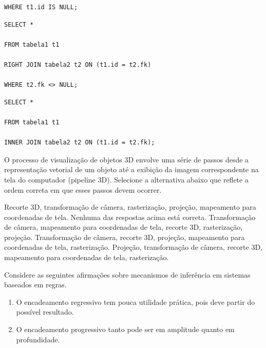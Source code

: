 \documentclass[12pt, addpoints]{exam}
\begin{document}
\begin{questions}
\begin{choices}
\begin{verbatim}
WHERE t1.id IS NULL;

\end{verbatim}


\choice \begin{verbatim}SELECT *

FROM tabela1 t1

RIGHT JOIN tabela2 t2 ON (t1.id = t2.fk)

WHERE t2.fk <> NULL;

\end{verbatim}


\choice \begin{verbatim}SELECT *

FROM tabela1 t1

INNER JOIN tabela2 t2 ON (t1.id = t2.fk);

\end{verbatim}


\end{choices}

\question

O processo de visualização de objetos 3D envolve uma série de passos desde a representação vetorial de um objeto até a exibição da imagem correspondente na tela do computador (pipeline 3D). Selecione a alternativa abaixo que reflete a ordem correta em que esses passos devem ocorrer. 
\begin{choices}
\choice Recorte 3D, transformação de câmera, rasterização, projeção, mapeamento para coordenadas de tela. 
\choice Nenhuma das respostas acima está correta.
\choice Transformação de câmera, mapeamento para coordenadas de tela, recorte 3D, rasterização, projeção. 
\choice Transformação de câmera, recorte 3D, projeção, mapeamento para coordenadas de tela, rasterização. 
\choice Projeção, transformação de câmera, recorte 3D, mapeamento para coordenadas de tela, rasterização. 
\end{choices}

\question

Considere as seguintes afirmações sobre mecanismos de inferência em sistemas baseados em regras.

\begin{enumerate}[label=\Roman*.]

    \item O encadeamento regressivo tem pouca utilidade prática, pois deve partir do possível resultado.

    \item O encadeamento progressivo tanto pode ser em amplitude quanto em profundidade.


\end{enumerate}
\end{questions}
\end{document}
